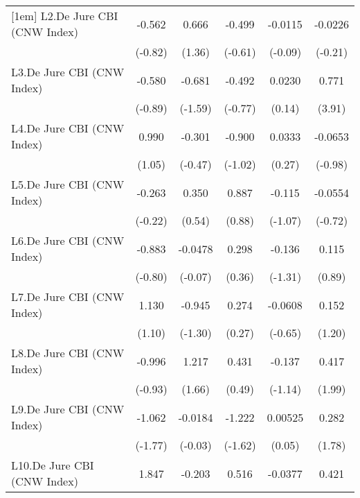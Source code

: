 {\begin{longtable}{l*{5}{c}}
[1em]
L2.De Jure CBI (CNW Index)&   -0.562         &    0.666         &   -0.499         &  -0.0115         &  -0.0226         \\
                &  (-0.82)         &   (1.36)         &  (-0.61)         &  (-0.09)         &  (-0.21)         \\
[1em]
L3.De Jure CBI (CNW Index)&   -0.580         &   -0.681         &   -0.492         &   0.0230         &    0.771\sym{***}\\
                &  (-0.89)         &  (-1.59)         &  (-0.77)         &   (0.14)         &   (3.91)         \\
[1em]
L4.De Jure CBI (CNW Index)&    0.990         &   -0.301         &   -0.900         &   0.0333         &  -0.0653         \\
                &   (1.05)         &  (-0.47)         &  (-1.02)         &   (0.27)         &  (-0.98)         \\
[1em]
L5.De Jure CBI (CNW Index)&   -0.263         &    0.350         &    0.887         &   -0.115         &  -0.0554         \\
                &  (-0.22)         &   (0.54)         &   (0.88)         &  (-1.07)         &  (-0.72)         \\
[1em]
L6.De Jure CBI (CNW Index)&   -0.883         &  -0.0478         &    0.298         &   -0.136         &    0.115         \\
                &  (-0.80)         &  (-0.07)         &   (0.36)         &  (-1.31)         &   (0.89)         \\
[1em]
L7.De Jure CBI (CNW Index)&    1.130         &   -0.945         &    0.274         &  -0.0608         &    0.152         \\
                &   (1.10)         &  (-1.30)         &   (0.27)         &  (-0.65)         &   (1.20)         \\
[1em]
L8.De Jure CBI (CNW Index)&   -0.996         &    1.217         &    0.431         &   -0.137         &    0.417\sym{*}  \\
                &  (-0.93)         &   (1.66)         &   (0.49)         &  (-1.14)         &   (1.99)         \\
[1em]
L9.De Jure CBI (CNW Index)&   -1.062         &  -0.0184         &   -1.222         &  0.00525         &    0.282         \\
                &  (-1.77)         &  (-0.03)         &  (-1.62)         &   (0.05)         &   (1.78)         \\
[1em]
L10.De Jure CBI (CNW Index)&    1.847\sym{***}&   -0.203         &    0.516         &  -0.0377         &    0.421         \\

\end{longtable}}
